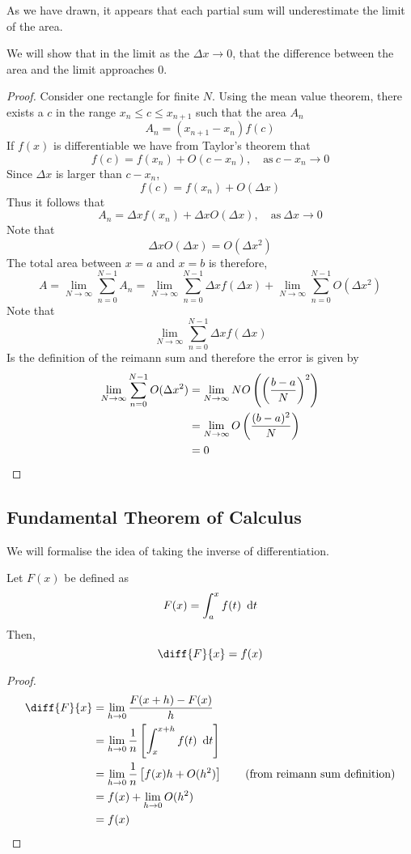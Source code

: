 \documentclass{article}
\begin{document}
As we have drawn, it appears that each partial sum will underestimate the limit of the area.
\begin{prop}
    We will show that in the limit as the $\Delta x \rightarrow 0$, that the difference between the area and the limit approaches $0$.
\end{prop}
\begin{proof}
    Consider one rectangle for finite $N$. 
    Using the mean value theorem, there exists a $c$ in the range $x_n \leq c \leq x_{n+1}$ such that the area $A_n$
    \[
        A_n = (x_{n+1} - x_n)f(c)  
    \]
    If $f(x)$ is differentiable we have from Taylor's theorem that
    \[
        f(c) = f(x_n) + O(c - x_n), \quad \text{as} \ c-x_n \rightarrow 0  
    \]
    Since $\Delta x$ is larger than $c - x_n$,
    \[
        f(c) = f(x_n) + O(\Delta x)
    \]
    Thus it follows that
    \[
        A_n =  \Delta x f(x_n) + \Delta x O(\Delta x), \quad \text{as} \ \Delta x \rightarrow 0 
    \]
    Note that
    \[
        \Delta x O(\Delta x) = O(\Delta x^2)
    \]
    The total area between $x=a$ and $x=b$ is therefore,
    \[
        A = \lim_{N \rightarrow \infty}{\sum_{n=0}^{N-1}{A_n}} = \lim_{N \rightarrow \infty}{\sum_{n=0}^{N-1}{\Delta x f(\Delta x)}} + \lim_{N \rightarrow \infty}{\sum_{n=0}^{N-1}{O(\Delta x^2)}}
    \]
    Note that
    \[
        \lim_{N \rightarrow \infty}{\sum_{n=0}^{N-1}{\Delta x f(\Delta x)}}
    \]
    Is the definition of the reimann sum and therefore the error is given by
    \begin{align*}
        \lim_{N \rightarrow \infty}{\sum_{n=0}^{N-1}{O(\Delta x^2)}} &= \lim_{N \rightarrow \infty}{NO \left( \left( \frac{b-a}{N} \right)^2 \right)} \\
        &= \lim_{N \rightarrow \infty}{O\left( \frac{(b-a)^2}{N} \right)} \\
        &= 0
    \end{align*}
\end{proof}

\subsection{Fundamental Theorem of Calculus}
We will formalise the idea of taking the inverse of differentiation.

\begin{thm}[FTC]
    Let $F(x)$ be defined as
    \[
        F(x) = \int_{a}^{x}{f(t) \ \diffd t}  
    \]
    Then,
    \[
        \diff{F}{x} = f(x)
    \]
\end{thm}
\begin{proof}
    \begin{align*}
        \diff{F}{x} &= \lim_{h \rightarrow 0}\frac{F(x + h) - F(x)}{h} \\
        &= \lim_{h \rightarrow 0}\frac{1}{n}\sqbkt{\int_{x}^{x+h}{f(t) \ \diffd t}} \\
        &= \lim_{h \rightarrow 0}\frac{1}{n}\sqbkt{f(x)h + O(h^2)} \tag{from reimann sum definition} \\
        &= f(x) + \lim_{h \rightarrow 0}O(h^2) \\
        &= f(x)
    \end{align*}
\end{proof}
\end{document}
